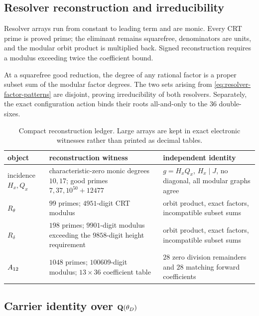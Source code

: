 \subsection{Resolver reconstruction and irreducibility}

Resolver arrays run from constant to leading term and are monic.  Every CRT
prime is proved prime; the eliminant remains squarefree, denominators are
units, and the modular orbit product is multiplied back.  Signed
reconstruction requires a modulus exceeding twice the coefficient bound.

At a squarefree good reduction, the degree of any rational factor is a
proper subset sum of the modular factor degrees.  The two sets arising from
\cref{eq:resolver-factor-patterns} are disjoint, proving irreducibility of
both resolvers.  Separately, the exact configuration action binds their roots
all-and-only to the \(36\) double-sixes.

\begin{table}[t]
\centering
\small
\begin{tabularx}{\textwidth}{@{}l>{\raggedright\arraybackslash}X
 >{\raggedright\arraybackslash}X@{}}
\toprule
object & reconstruction witness & independent identity\\
\midrule
incidence \(H_x,Q_x\)
& characteristic-zero monic degrees \(10,17\); good primes
\(7,37,10^{50}+12477\)
& \(g=H_xQ_x\), \(H_x\mid J\), no diagonal, all modular graphs agree\\
\(R_\theta\)
& \(99\) primes; \(4951\)-digit CRT modulus
& orbit product, exact factors, incompatible subset sums\\
\(R_\delta\)
& \(198\) primes; \(9901\)-digit modulus exceeding the \(9858\)-digit
height requirement
& orbit product, exact factors, incompatible subset sums\\
\(A_{12}\)
& \(1048\) primes; \(100609\)-digit modulus; \(13\times36\) coefficient
table
& \(28\) zero division remainders and \(28\) matching forward coefficients\\
\bottomrule
\end{tabularx}
\caption{Compact reconstruction ledger.  Large arrays are kept in exact
electronic witnesses rather than printed as decimal tables.}
\label{tab:resolver-ledger}
\end{table}

\subsection{Carrier identity over
\texorpdfstring{\(\mathbf Q(\theta_D)\)}{Q(theta-D)}}

